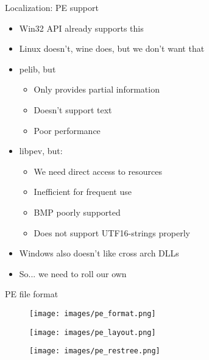 \documentclass{beamer}
\begin{document}
\begin{frame}{Localization: PE support}
	\begin{itemize}
		\item Win32 API already supports this
		\item Linux doesn't, wine does, but we don't want that
		\item pelib, but
		\begin{itemize}
			\item Only provides partial information
			\item Doesn't support text
			\item Poor performance
		\end{itemize}
		\item libpev, but:
		\begin{itemize}
			\item We need direct access to resources
			\item Inefficient for frequent use
			\item BMP poorly supported
			\item Does not support UTF16-strings properly
		\end{itemize}
		\item Windows also doesn't like cross arch DLLs
		\item So... we need to roll our own
	\end{itemize}
\end{frame}


\begin{frame}{PE file format}
	\begin{figure}
	\texttt{[image: images/pe\_format.png]}
	\end{figure}
\end{frame}


\begin{frame}{}
	\begin{figure}
	\texttt{[image: images/pe\_layout.png]}
	\end{figure}
\end{frame}


\begin{frame}{}
	\begin{figure}
	\texttt{[image: images/pe\_restree.png]}
	\end{figure}
\end{frame}
\end{document}
